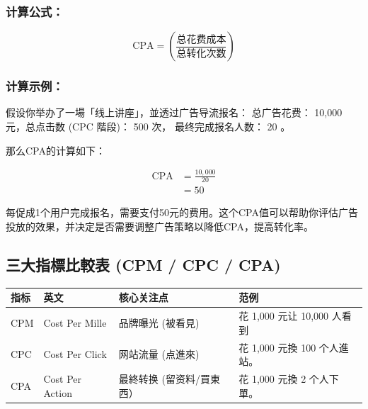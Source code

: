 \documentclass[
]{ctexart}
\newcounter{none} %
\begin{document}
\subsubsection{计算公式：}\label{ux8ba1ux7b97ux516cux5f0f-2}

\[
\text{CPA} = \left( \frac{\text{总花费成本}}{\text{总转化次数}} \right)
\]

\subsubsection{计算示例：}\label{ux8ba1ux7b97ux793aux4f8b-2}

假设你举办了一場「线上讲座」，並透过广告导流报名： 总广告花费： 10,000
元，总点击数 (CPC 階段)： 500 次， 最终完成报名人数： 20 。

那么CPA的计算如下：

\[
\begin{aligned}
\text{CPA} &= \frac{10,000}{20}  \\
           &= 50
\end{aligned}
\]

每促成1个用户完成报名，需要支付50元的费用。这个CPA值可以帮助你评估广告投放的效果，并决定是否需要调整广告策略以降低CPA，提高转化率。

\subsection{三大指標比較表 (CPM / CPC /
CPA)}\label{ux4e09ux5927ux6307ux6a19ux6bd4ux8f03ux8868-cpm-cpc-cpa}

{\def\LTcaptype{none} %
\begin{longtable}[]{@{}
  >{\raggedright\arraybackslash}p{}
  >{\raggedright\arraybackslash}p{}
  >{\raggedright\arraybackslash}p{}
  >{\raggedright\arraybackslash}p{}@{}}
\toprule\noalign{}
\begin{minipage}[b]{\linewidth}\raggedright
指标
\end{minipage} & \begin{minipage}[b]{\linewidth}\raggedright
英文
\end{minipage} & \begin{minipage}[b]{\linewidth}\raggedright
核心关注点
\end{minipage} & \begin{minipage}[b]{\linewidth}\raggedright
范例
\end{minipage} \\
\midrule\noalign{}
\endhead
\bottomrule\noalign{}
\endlastfoot
CPM & Cost Per Mille & 品牌曝光 (被看見) & 花 1,000 元让 10,000
人看到 \\
CPC & Cost Per Click & 网站流量 (点進來) & 花 1,000 元換 100
个人進站。 \\
CPA & Cost Per Action & 最終转换 (留资料/買東西） & 花 1,000 元換 2
个人下單。 \\
\end{longtable}
}
\end{document}
